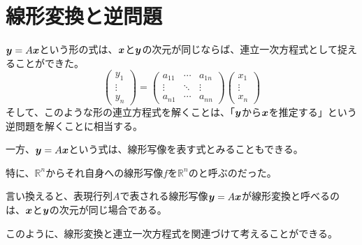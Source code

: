 \documentclass[../../../topic_linear-algebra]{subfiles}
\begin{document}
\sectionline
\section{線形変換と逆問題}

$\vb*{y} = A\vb*{x}$という形の式は、$\vb*{x}$と$\vb*{y}$の次元が同じならば、連立一次方程式として捉えることができた。
\begin{equation*}
  \begin{pmatrix}
    y_1    \\
    \vdots \\
    y_n
  \end{pmatrix} = \begin{pmatrix}
    a_{11} & \cdots & a_{1n} \\
    \vdots & \ddots & \vdots \\
    a_{n1} & \cdots & a_{nn}
  \end{pmatrix} \begin{pmatrix}
    x_1    \\
    \vdots \\
    x_n
  \end{pmatrix}
\end{equation*}
そして、このような形の連立方程式を解くことは、「$\vb*{y}$から$\vb*{x}$を推定する」という逆問題を解くことに相当する。

\br

一方、$\vb*{y} = A\vb*{x}$という式は、線形写像を表す式とみることもできる。

特に、$\mathbb{R}^n$からそれ自身への線形写像$f$を$\mathbb{R}^n$のと呼ぶのだった。

\br

言い換えると、表現行列$A$で表される線形写像$\vb*{y} = A\vb*{x}$が線形変換と呼べるのは、$\vb*{x}$と$\vb*{y}$の次元が同じ場合である。

このように、線形変換と連立一次方程式を関連づけて考えることができる。
\end{document}
